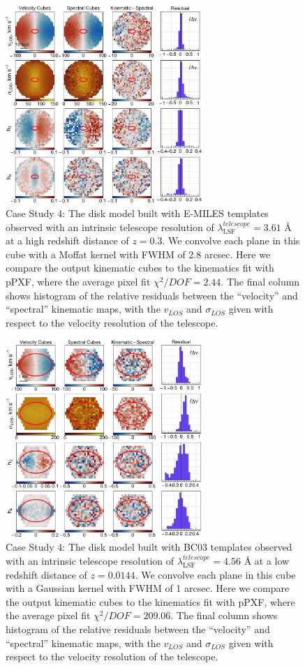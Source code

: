 \documentclass[
  journal=pasa,
  manuscript=research-paper, %
  year=2020,
  volume=37,
]{cup-journal}
\begin{document}

\begin{figure}
    \centering
    \includegraphics[keepaspectratio, width=7.5cm]{cs4_disk_velocities_highz_fwhm_blur_EMILES.jpeg}
    \caption{Case Study 4: The disk model built with E-MILES templates observed with an intrinsic telescope resolution of  $\lambda_{\text{LSF}}^{telescope} = 3.61$ \AA{} at a high redshift distance of $z = 0.3$. We convolve each plane in this cube with a Moffat kernel with FWHM of 2.8 arcsec. Here we compare the output kinematic cubes to the kinematics fit with pPXF, where the average pixel fit $\chi^2/DOF = 2.44$. The final column shows histogram of the relative residuals between the ``velocity'' and ``spectral'' kinematic maps, with the $v_{LOS}$ and $\sigma_{LOS}$ given with respect to the velocity resolution of the telescope.}
    \label{fig:cs4_disk_highz_E-MILES}
\end{figure}

\begin{figure}
    \centering
    \includegraphics[keepaspectratio, width=7.5cm]{cs4_disk_velocities_lowz_fwhm_blur_BC03.jpeg}
    \caption{Case Study 4: The disk model built with BC03 templates observed with an intrinsic telescope resolution of  $\lambda_{\text{LSF}}^{telescope} = 4.56$ \AA{} at a low redshift distance of $z = 0.0144$. We convolve each plane in this cube with a Gaussian kernel with FWHM of 1 arcsec. Here we compare the output kinematic cubes to the kinematics fit with pPXF, where the average pixel fit $\chi^2/DOF = 209.06$. The final column shows histogram of the relative residuals between the ``velocity'' and ``spectral'' kinematic maps, with the $v_{LOS}$ and $\sigma_{LOS}$ given with respect to the velocity resolution of the telescope.}
    \label{fig:cs4_disk_lowz_BC03}
\end{figure}
\end{document}
